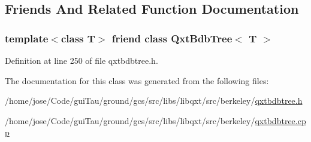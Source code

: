 \subsection{Friends And Related Function Documentation}
\hypertarget{class_qxt_bdb_tree_iterator_a219e8c7d5d4a780ab2801235f58c0fd3}{
\subsubsection[{Qxt\-Bdb\-Tree$<$ T $>$}]{\setlength{\rightskip}{0pt plus 5cm}template$<$class T$>$ friend class {\bf Qxt\-Bdb\-Tree}$<$ T $>$\hspace{0.3cm}{\ttfamily [friend]}}}\label{class_qxt_bdb_tree_iterator_a219e8c7d5d4a780ab2801235f58c0fd3}


Definition at line 250 of file qxtbdbtree.\-h.



The documentation for this class was generated from the following files\-:\begin{DoxyCompactItemize}
\item 
/home/jose/\-Code/gui\-Tau/ground/gcs/src/libs/libqxt/src/berkeley/\hyperlink{qxtbdbtree_8h}{qxtbdbtree.\-h}\item 
/home/jose/\-Code/gui\-Tau/ground/gcs/src/libs/libqxt/src/berkeley/\hyperlink{qxtbdbtree_8cpp}{qxtbdbtree.\-cpp}\end{DoxyCompactItemize}
